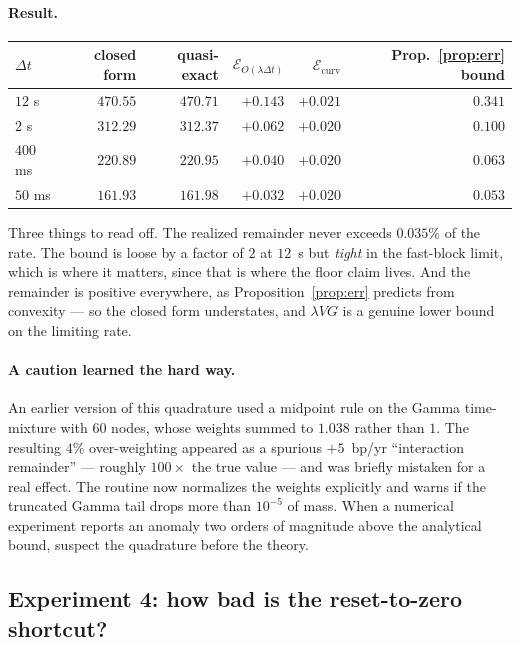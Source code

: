 \documentclass[11pt]{article}
\theoremstyle{definition}
\theoremstyle{remark}
\newcommand{\dt}{\Delta t}
\newcommand{\1}{\mathbf{1}}
\begin{document}
\paragraph{Result.}
\begin{center}
\begin{tabular}{lrrrrr}
\toprule
$\dt$ & closed form & quasi-exact & $\mathcal E_{O(\lambda\dt)}$ & $\mathcal E_{\mathrm{curv}}$ & Prop.~\ref{prop:err} bound \\
\midrule
$12$ s   & $470.55$ & $470.71$ & $+0.143$ & $+0.021$ & $0.341$ \\
$2$ s    & $312.29$ & $312.37$ & $+0.062$ & $+0.020$ & $0.100$ \\
$400$ ms & $220.89$ & $220.95$ & $+0.040$ & $+0.020$ & $0.063$ \\
$50$ ms  & $161.93$ & $161.98$ & $+0.032$ & $+0.020$ & $0.053$ \\
\bottomrule
\end{tabular}
\end{center}
Three things to read off. The realized remainder never exceeds $0.035\%$ of the rate. The bound is loose by a factor of $2$ at $12$~s but \emph{tight} in the fast-block limit, which is where it matters, since that is where the floor claim lives. And the remainder is positive everywhere, as Proposition~\ref{prop:err} predicts from convexity --- so the closed form understates, and $\lambda VG$ is a genuine lower bound on the limiting rate.

\paragraph{A caution learned the hard way.} An earlier version of this quadrature used a midpoint rule on the Gamma time-mixture with $60$ nodes, whose weights summed to $1.038$ rather than $1$. The resulting $4\%$ over-weighting appeared as a spurious $+5$~bp/yr ``interaction remainder'' --- roughly $100\times$ the true value --- and was briefly mistaken for a real effect. The routine now normalizes the weights explicitly and warns if the truncated Gamma tail drops more than $10^{-5}$ of mass. When a numerical experiment reports an anomaly two orders of magnitude above the analytical bound, suspect the quadrature before the theory.

\subsection{Experiment 4: how bad is the reset-to-zero shortcut?}
\end{document}
